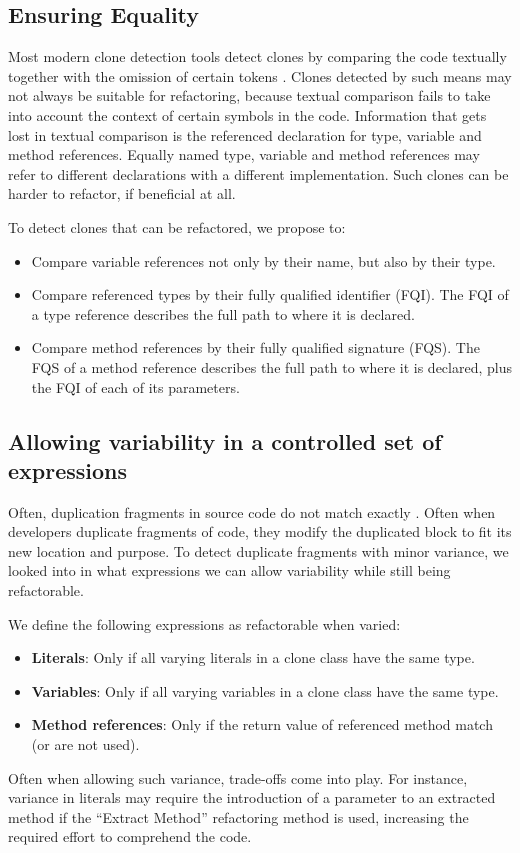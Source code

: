\documentclass[sigconf,review]{acmart}
\begin{document}
\subsection{Ensuring Equality}\label{sec:t1r}
Most modern clone detection tools detect clones by comparing the code textually together with the omission of certain tokens \cite{roy2009comparison, svajlenko2014evaluating}. Clones detected by such means may not always be suitable for refactoring, because textual comparison fails to take into account the context of certain symbols in the code. Information that gets lost in textual comparison is the referenced declaration for type, variable and method references. Equally named type, variable and method references may refer to different declarations with a different implementation. Such clones can be harder to refactor, if beneficial at all.

To detect clones that can be refactored, we propose to:
\begin{itemize}
  \item Compare variable references not only by their name, but also by their type.
  \item Compare referenced types by their fully qualified identifier (FQI). The FQI of a type reference describes the full path to where it is declared.
  \item Compare method references by their fully qualified signature (FQS). The FQS of a method reference describes the full path to where it is declared, plus the FQI of each of its parameters.
\end{itemize}


\subsection{Allowing variability in a controlled set of expressions} \label{sec:t2r}
Often, duplication fragments in source code do not match exactly \cite{kodhai2013method}. Often when developers duplicate fragments of code, they modify the duplicated block to fit its new location and purpose. To detect duplicate fragments with minor variance, we looked into in what expressions we can allow variability while still being refactorable.

We define the following expressions as refactorable when varied:
\begin{itemize}
  \item \textbf{Literals}: Only if all varying literals in a clone class have the same type.
  \item \textbf{Variables}: Only if all varying variables in a clone class have the same type.
  \item \textbf{Method references}: Only if the return value of referenced method match (or are not used).
\end{itemize}
Often when allowing such variance, trade-offs come into play. For instance, variance in literals may require the introduction of a parameter to an extracted method if the ``Extract Method'' refactoring method is used, increasing the required effort to comprehend the code.
\end{document}
